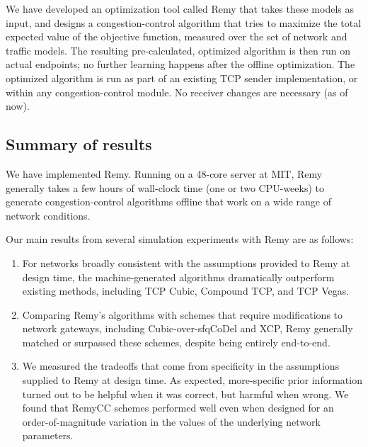 \documentclass{article}
\begin{document}
We have developed an optimization tool called Remy that takes these
models as input, and designs a congestion-control algorithm that tries
to maximize the total expected value of the objective function, measured over the set of
network and traffic models. The resulting pre-calculated, optimized
algorithm is then run on actual endpoints; no further learning happens
after the offline optimization. The optimized algorithm is run as part
of an existing TCP sender implementation, or within any
congestion-control module. No receiver changes are necessary (as of
now).

\subsection*{Summary of results}

We have implemented Remy. Running on a 48-core server at MIT, Remy
generally takes a few hours of wall-clock time (one or two CPU-weeks)
to generate congestion-control algorithms offline that work on a wide
range of network conditions.

Our main results from several simulation experiments
with Remy are as follows:

\begin{enumerate}

\item For networks broadly consistent with the assumptions provided to
  Remy at design time, the machine-generated algorithms dramatically
  outperform existing methods, including TCP Cubic, Compound TCP, and
  TCP Vegas.

\item Comparing Remy's algorithms with schemes that require
  modifications to network gateways, including Cubic-over-sfqCoDel and
  XCP, Remy generally matched or surpassed these schemes, despite
  being entirely end-to-end.

\item We measured the tradeoffs that come from specificity in the
  assumptions supplied to Remy at design time. As expected,
  more-specific prior information turned out to be helpful when it was
  correct, but harmful when wrong. We found that RemyCC schemes
  performed well even when designed for an order-of-magnitude
  variation in the values of the underlying network parameters.
\end{enumerate}
\end{document}
